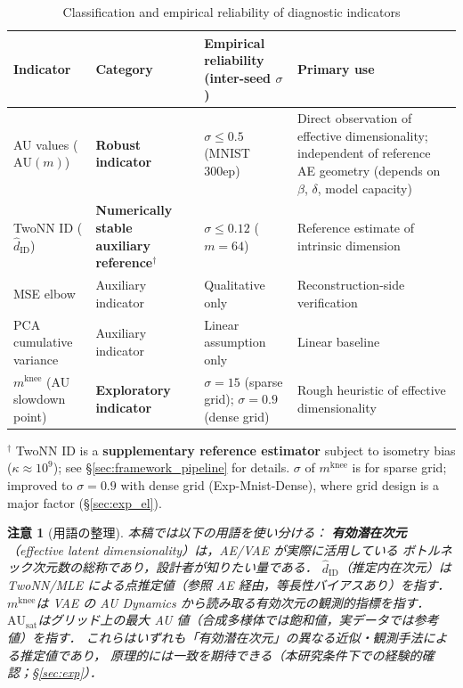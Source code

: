 \documentclass[11pt,a4paper]{jsarticle}
\newtheorem{remark}{注意}
\newcommand{\kap}{\kappa}
\newcommand{\AUsat}{\mathrm{AU}_{\mathrm{sat}}}
\newcommand{\mknee}{m^{\mathrm{knee}}}
\begin{document}
\begin{table}[H]
\centering
\caption{Classification and empirical reliability of diagnostic indicators}
\label{tab:indicator_class}
\small
\begin{tabular}{p{3.3cm}p{3.1cm}p{3.9cm}p{4.0cm}}
\toprule
Indicator & Category & Empirical reliability (inter-seed $\sigma$) & Primary use \\
\midrule
AU values ($\mathrm{AU}(m)$) & \textbf{Robust indicator} & $\sigma \leq 0.5$ (MNIST 300ep) & Direct observation of effective dimensionality; independent of reference AE geometry (depends on $\beta$, $\delta$, model capacity) \\
TwoNN ID ($\hat{d}_\mathrm{ID}$) & \textbf{Numerically stable auxiliary reference}$^\dagger$ & $\sigma \leq 0.12$ ($m=64$) & Reference estimate of intrinsic dimension \\
MSE elbow & Auxiliary indicator & Qualitative only & Reconstruction-side verification \\
PCA cumulative variance & Auxiliary indicator & Linear assumption only & Linear baseline \\
$\mknee$ (AU slowdown point) & \textbf{Exploratory indicator} & $\sigma=15$ (sparse grid); $\sigma=0.9$ (dense grid) & Rough heuristic of effective dimensionality \\
\bottomrule
\end{tabular}
\medskip
\footnotesize
$^\dagger$ TwoNN ID is a \textbf{supplementary reference estimator} subject to isometry bias ($\kap \approx 10^9$); see §\ref{sec:framework_pipeline} for details.
$\sigma$ of $\mknee$ is for sparse grid; improved to $\sigma=0.9$ with dense grid (Exp-Mnist-Dense), where grid design is a major factor (§\ref{sec:exp_el}).
\normalsize
\end{table}

\begin{remark}[用語の整理]
本稿では以下の用語を使い分ける：
\textbf{有効潜在次元}（effective latent dimensionality）は，AE/VAE が実際に活用している
ボトルネック次元数の総称であり，設計者が知りたい量である．
\textbf{$\hat{d}_\mathrm{ID}$}（推定内在次元）は TwoNN/MLE による点推定値（参照 AE 経由，等長性バイアスあり）を指す．
\textbf{$\mknee$}は VAE の AU Dynamics から読み取る有効次元の観測的指標を指す．
\textbf{$\AUsat$}はグリッド上の最大 AU 値（合成多様体では飽和値，実データでは参考値）を指す．
これらはいずれも「有効潜在次元」の異なる近似・観測手法による推定値であり，
原理的には一致を期待できる（本研究条件下での経験的確認；§\ref{sec:exp}）．
\end{remark}
\end{document}
